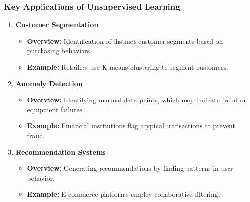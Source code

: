 \documentclass[aspectratio=169]{beamer}
\begin{document}
\begin{frame}[fragile]
    \frametitle{Key Applications of Unsupervised Learning}
    \begin{enumerate}
        \item \textbf{Customer Segmentation}
            \begin{itemize}
                \item \textbf{Overview:} Identification of distinct customer segments based on purchasing behaviors.
                \item \textbf{Example:} Retailers use K-means clustering to segment customers.
            \end{itemize}
            
        \item \textbf{Anomaly Detection}
            \begin{itemize}
                \item \textbf{Overview:} Identifying unusual data points, which may indicate fraud or equipment failures.
                \item \textbf{Example:} Financial institutions flag atypical transactions to prevent fraud.
            \end{itemize}
        
        \item \textbf{Recommendation Systems}
            \begin{itemize}
                \item \textbf{Overview:} Generating recommendations by finding patterns in user behavior.
                \item \textbf{Example:} E-commerce platforms employ collaborative filtering.
            \end{itemize}
    \end{enumerate}
\end{frame}
\end{document}

